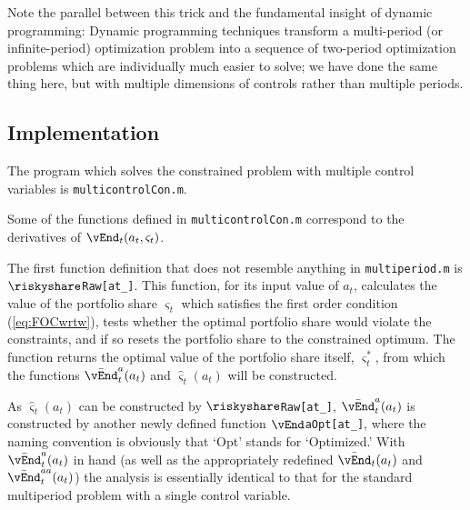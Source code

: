 \documentclass[titlepage]{\econtex}
\begin{document}
Note the parallel between this trick and the fundamental insight of
dynamic programming: Dynamic programming techniques transform a
multi-period (or infinite-period) optimization problem into a sequence
of two-period optimization problems which are individually much easier
to solve; we have done the same thing here, but with multiple dimensions
of controls rather than multiple periods.

\hypertarget{Implementation}{}
\subsection{Implementation}

The program which solves the constrained problem with multiple control variables
is \texttt{multicontrolCon.m}.

Some of the functions defined in \texttt{multicontrolCon.m} correspond
to the derivatives of $\vEnd_{t}({a}_{t},\varsigma_{t})$.

The first function definition that does not resemble anything in \texttt{multiperiod.m} is
\texttt{$\riskyshare$Raw[at\_]}. This function, for its input value of
${a}_{t}$, calculates the value of the portfolio share $\varsigma_{t}$
which satisfies the first order condition (\ref{eq:FOCwrtw}), tests
whether the optimal portfolio share would violate the constraints,
and if so resets the portfolio share to the constrained optimum. The
function returns the optimal value of the portfolio share itself,
$\varsigma_{t}^{*}$, from which the functions
$\bar{\vEnd}_{t}^{a}({a}_{t})$ and $\hat{\varsigma}_{t}({a}_{t})$ will be
constructed.

As $\hat{\varsigma}_{t}({a}_{t})$ can be constructed by
\texttt{$\riskyshare$Raw[at\_]}, $\bar{\vEnd}_{t}^{a}({a}_{t})$ is
constructed by another newly defined function
\texttt{$\vEnd$aOpt[at\_]}, where the naming convention is obviously
that `Opt' stands for `Optimized.' With
$\bar{\vEnd}_{t}^{{a}}({a}_{t})$ in
hand (as well as the appropriately redefined
$\bar{\vEnd}_{t}({a}_{t})$ and $\bar{\vEnd}_{t}^{{aa}}({a}_{t})$) the analysis is essentially identical to that for the standard
multiperiod problem with a single control variable.
\end{document}
